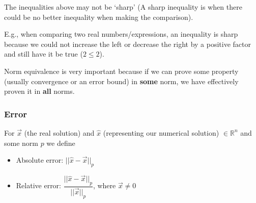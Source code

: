 \documentclass[12pt]{article}
\begin{document}
The inequalities above may not be `sharp' (A sharp inequality is when there could be no better inequality when making the comparison). 

E.g., when comparing two real numbers/expressions, an inequality is sharp because we could not increase the left or decrease the right by a positive factor and still have it be true ($2 \leq 2$). 

%

Norm equivalence is very important because if we can prove some property (usually convergence or an error bound) in \textbf{some} norm, we have effectively proven it in \textbf{all} norms. 

\subsubsection*{Error}
For $\vec{x}$ (the real solution) and $\hat{x}$ (representing our numerical solution) $\in \mathbb{R}^n$ and some norm $p$ we define
%
\begin{itemize}
\item Absolute error: $||\hat{x} - \vec{x}||_p$
\item Relative error: $\dfrac{||\hat{x} - \vec{x}||_p}{||\vec{x}||_p}$, where $\vec{x} \neq 0$
\end{itemize}
\end{document}
